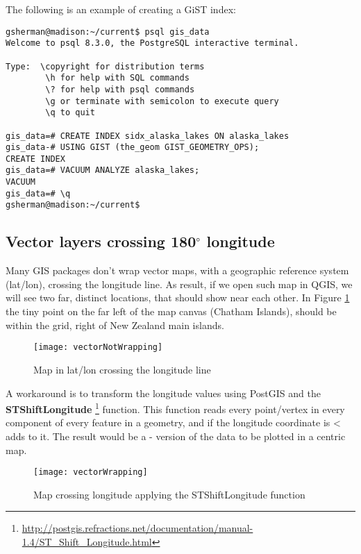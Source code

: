 The following is an example of creating a GiST index:
\begin{verbatim}
gsherman@madison:~/current$ psql gis_data
Welcome to psql 8.3.0, the PostgreSQL interactive terminal.

Type:  \copyright for distribution terms
        \h for help with SQL commands
        \? for help with psql commands
        \g or terminate with semicolon to execute query
        \q to quit

gis_data=# CREATE INDEX sidx_alaska_lakes ON alaska_lakes
gis_data-# USING GIST (the_geom GIST_GEOMETRY_OPS);
CREATE INDEX
gis_data=# VACUUM ANALYZE alaska_lakes;
VACUUM
gis_data=# \q
gsherman@madison:~/current$
\end{verbatim}

\subsection{Vector layers crossing 180$^\circ$ longitude}

Many GIS packages don't wrap vector maps, with a geographic reference system
(lat/lon), crossing the  longitude line. As result, if
we open such map in QGIS, we will see two far, distinct locations, that
should show near each other. In Figure \ref{fig:vector_not_wrapping} the tiny
point on the far left of the map canvas (Chatham Islands), should be within
the grid, right of New Zealand main islands.

\begin{figure}[ht]
   \begin{center}
   \caption{Map in lat/lon crossing the  longitude line
   \nixcaption}
   \label{fig:vector_not_wrapping}\smallskip
   \texttt{[image: vectorNotWrapping]}
\end{center}
\end{figure}

A workaround is to transform the longitude values using PostGIS and the
\textbf{ST\textunderscore Shift\textunderscore Longitude}
\footnote{\url{http://postgis.refractions.net/documentation/manual-1.4/ST_Shift_Longitude.html}}
function. This function reads every point/vertex in every component of every
feature in a geometry, and if the longitude coordinate is <  adds
 to it. The result would be a  -  version of
the data to be plotted in a  centric map.

\begin{figure}[ht]
   \begin{center}
   \caption{Map crossing  longitude applying the ST\textunderscore Shift\textunderscore Longitude function \nixcaption}
\label{fig:vector_wrapping}\smallskip
   \texttt{[image: vectorWrapping]}
\end{center}
\end{figure}

